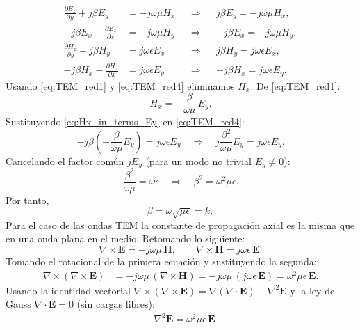 \documentclass[
  11pt,
  letterpaper,
   addpoints,
   answers
  ]{exam}
\begin{document}
\begin{questions}
\begin{parts}
\begin{solution}
\begin{align}
\frac{\partial E_z}{\partial y}+j\beta E_y&=-j\omega\mu H_x
&&\Longrightarrow&& j\beta E_y=-j\omega\mu H_x,
\label{eq:TEM_red1}\\
-j\beta E_x-\frac{\partial E_z}{\partial x}&=-j\omega\mu H_y
&&\Longrightarrow&& -j\beta E_x=-j\omega\mu H_y,
\label{eq:TEM_red2}\\
\frac{\partial H_z}{\partial y}+j\beta H_y&=j\omega\epsilon E_x
&&\Longrightarrow&& j\beta H_y=j\omega\epsilon E_x,
\label{eq:TEM_red3}\\
-j\beta H_x-\frac{\partial H_z}{\partial x}&=j\omega\epsilon E_y
&&\Longrightarrow&& -j\beta H_x=j\omega\epsilon E_y.
\label{eq:TEM_red4}
\end{align}
Usando \eqref{eq:TEM_red1} y \eqref{eq:TEM_red4} eliminamos $H_x$.
De \eqref{eq:TEM_red1}:
\begin{equation}
H_x=-\frac{\beta}{\omega\mu}\,E_y.
\label{eq:Hx_in_terms_Ey}
\end{equation}
Sustituyendo \eqref{eq:Hx_in_terms_Ey} en \eqref{eq:TEM_red4}:
\begin{equation}
-j\beta\left(-\frac{\beta}{\omega\mu}E_y\right)=j\omega\epsilon E_y
\quad\Longrightarrow\quad
j\frac{\beta^2}{\omega\mu}E_y=j\omega\epsilon E_y.
\end{equation}
Cancelando el factor común $jE_y$ (para un modo no trivial $E_y\neq 0$):
\begin{equation}
\frac{\beta^2}{\omega\mu}=\omega\epsilon
\quad\Longrightarrow\quad
\beta^2=\omega^2\mu\epsilon.
\end{equation}
Por tanto,
\begin{equation}
\beta=\omega\sqrt{\mu\epsilon}=k,
\end{equation}
Para el caso de las ondas TEM la constante de propagación axial es la misma que en una onda plana en el medio. Retomando lo siguiente:
\[
\nabla\times\mathbf{E}=-j\omega\mu\,\mathbf{H},\qquad \nabla\times\mathbf{H}=j\omega\epsilon\,\mathbf{E}.
\]
Tomando el rotacional de la primera ecuación y sustituyendo la segunda:
\begin{align*}
\nabla\times(\nabla\times\mathbf{E})
&=-j\omega\mu\,(\nabla\times\mathbf{H})
=-j\omega\mu\,(j\omega\epsilon\,\mathbf{E})
=\omega^2\mu\epsilon\,\mathbf{E}.
\end{align*}
Usando la identidad vectorial $\nabla\times(\nabla\times\mathbf{E})=\nabla(\nabla\cdot\mathbf{E})-\nabla^2\mathbf{E}$
y la ley de Gauss $\nabla\cdot\mathbf{E}=0$ (sin cargas libres):
\begin{align*}
-\nabla^2\mathbf{E}=\omega^2\mu\epsilon\,\mathbf{E}

\end{align*}
\end{solution}
\end{parts}
\end{questions}
\end{document}
